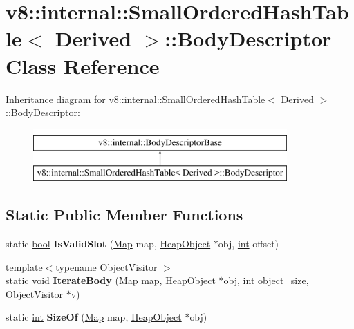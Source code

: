 \hypertarget{classv8_1_1internal_1_1SmallOrderedHashTable_1_1BodyDescriptor}{}\section{v8\+:\+:internal\+:\+:Small\+Ordered\+Hash\+Table$<$ Derived $>$\+:\+:Body\+Descriptor Class Reference}
\label{classv8_1_1internal_1_1SmallOrderedHashTable_1_1BodyDescriptor}
Inheritance diagram for v8\+:\+:internal\+:\+:Small\+Ordered\+Hash\+Table$<$ Derived $>$\+:\+:Body\+Descriptor\+:\begin{figure}[H]
\begin{center}
\leavevmode
\includegraphics[height=2.000000cm]{classv8_1_1internal_1_1SmallOrderedHashTable_1_1BodyDescriptor}
\end{center}
\end{figure}
\subsection*{Static Public Member Functions}
\begin{DoxyCompactItemize}
\item 
\mbox{\label{classv8_1_1internal_1_1SmallOrderedHashTable_1_1BodyDescriptor_a3c45ae4132c0b06f8d2f2d36f7f58938}} 
static \mbox{\hyperlink{classbool}{bool}} {\bfseries Is\+Valid\+Slot} (\mbox{\hyperlink{classv8_1_1internal_1_1Map}{Map}} map, \mbox{\hyperlink{classv8_1_1internal_1_1HeapObject}{Heap\+Object}} $\ast$obj, \mbox{\hyperlink{classint}{int}} offset)
\item 
\mbox{\label{classv8_1_1internal_1_1SmallOrderedHashTable_1_1BodyDescriptor_a93dbd66f9a93ce300c4ed7a808248305}} 
{\footnotesize template$<$typename Object\+Visitor $>$ }\\static void {\bfseries Iterate\+Body} (\mbox{\hyperlink{classv8_1_1internal_1_1Map}{Map}} map, \mbox{\hyperlink{classv8_1_1internal_1_1HeapObject}{Heap\+Object}} $\ast$obj, \mbox{\hyperlink{classint}{int}} object\+\_\+size, \mbox{\hyperlink{classv8_1_1internal_1_1ObjectVisitor}{Object\+Visitor}} $\ast$v)
\item 
\mbox{\label{classv8_1_1internal_1_1SmallOrderedHashTable_1_1BodyDescriptor_a1306fdb32b6d8d628c7511a4bc82eae4}} 
static \mbox{\hyperlink{classint}{int}} {\bfseries Size\+Of} (\mbox{\hyperlink{classv8_1_1internal_1_1Map}{Map}} map, \mbox{\hyperlink{classv8_1_1internal_1_1HeapObject}{Heap\+Object}} $\ast$obj)
\end{DoxyCompactItemize}
